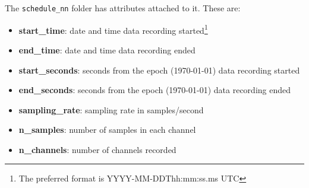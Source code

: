 \documentclass{article}
\newcommand{\attr}[1]{\textbf{#1}}
\begin{document}
The \verb|schedule_nn| folder has attributes attached to it.  These are:

\begin{itemize}
	\setlength{\itemsep}{.1em}
	\item \attr{start\_time}: date and time data recording started\footnote[1]{The preferred format is YYYY-MM-DDThh:mm:ss.ms UTC}
	\item \attr{end\_time}: date and time data recording ended\footnotemark[1]
	\item \attr{start\_seconds}: seconds from the epoch (1970-01-01) data recording started
	\item \attr{end\_seconds}: seconds from the epoch (1970-01-01) data recording ended
	\item \attr{sampling\_rate}: sampling rate in samples/second
	\item \attr{n\_samples}: number of samples in each channel
	\item \attr{n\_channels}: number of channels recorded
\end{itemize}  

   
\end{document}
